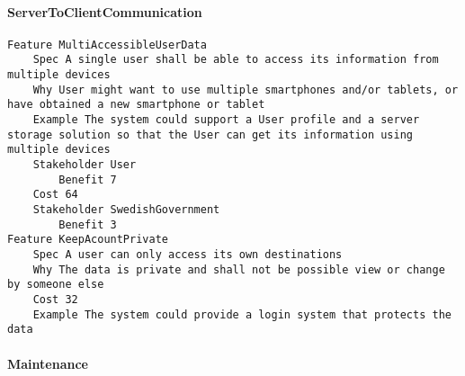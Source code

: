 				
			 \paragraph{ServerToClientCommunication}


\begin{lstlisting}
Feature MultiAccessibleUserData
	Spec A single user shall be able to access its information from multiple devices
	Why User might want to use multiple smartphones and/or tablets, or have obtained a new smartphone or tablet
	Example The system could support a User profile and a server storage solution so that the User can get its information using multiple devices
	Stakeholder User
		Benefit 7
	Cost 64
	Stakeholder SwedishGovernment
		Benefit 3
Feature KeepAcountPrivate
	Spec A user can only access its own destinations
	Why The data is private and shall not be possible view or change by someone else
	Cost 32
	Example The system could provide a login system that protects the data

\end{lstlisting}
		
				
			 \paragraph{Maintenance}



